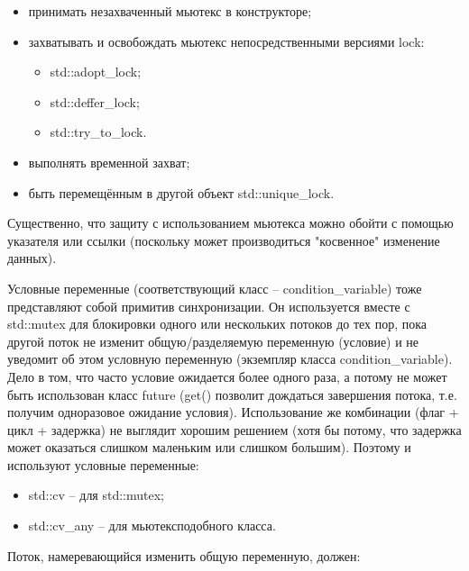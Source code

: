 \documentclass[a4paper,12pt]{article}	%
\begin{document}
	\begin{itemize}
	
		\item принимать незахваченный мьютекс в конструкторе;
		\item захватывать и освобождать мьютекс непосредственными версиями lock:
		
		\begin{itemize}
			
			\item std::adopt\_lock;
			\item std::deffer\_lock;
			\item std::try\_to\_lock.			
			
		\end{itemize}				
		
		\item выполнять временной захват;
		\item быть перемещённым в другой объект std::unique\_lock.
		
	\end{itemize}
		
	Существенно, что защиту с использованием мьютекса можно обойти с помощью указателя или ссылки (поскольку может производиться "косвенное" изменение данных).
	
	Условные переменные (соответствующий класс -- condition\_variable) тоже представляют собой примитив синхронизации. Он используется вместе с std::mutex для блокировки одного или нескольких потоков до тех пор, пока другой поток не изменит общую/разделяемую переменную (условие) и не уведомит об этом условную переменную (экземпляр класса condition\_variable). Дело в том, что часто условие ожидается более одного раза, а потому не может быть использован класс future (get() позволит дождаться завершения потока, т.е. получим одноразовое ожидание условия). Использование же комбинации (флаг + цикл + задержка) не выглядит хорошим решением (хотя бы потому, что задержка может оказаться слишком маленьким или слишком большим). Поэтому и используют условные переменные:
	
	\begin{itemize}
	
		\item std::cv -- для std::mutex;
		\item std::cv\_any -- для мьютексподобного класса.
		
	\end{itemize}
	
	Поток, намеревающийся изменить общую переменную, должен:
	
\end{document}
